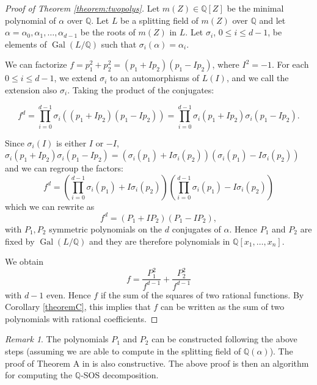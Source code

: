 \documentclass{amsart}
\theoremstyle{definition}
\theoremstyle{remark}
\newtheorem{remark}[theorem]{Remark}
\numberwithin{equation}{section}
\DeclareMathOperator{\Gal}{Gal}
\newcommand{\Q}{{\mathbb Q}}
\begin{document}
\begin{proof}[Proof of Theorem \ref{theorem:twopolys}]
Let $m(Z) \in \Q[Z]$ be the minimal polynomial of $\alpha$ over $\Q$.
Let $L$ be a splitting field of $m(Z)$ over $\Q$ and let $\alpha = \alpha_0, \alpha_1, \dots, \alpha_{d-1}$ be the roots of $m(Z)$ in $L$. Let $\sigma_i$, $0 \le i \le {d-1}$, be elements of $\Gal(L / \Q)$ such that $\sigma_i(\alpha) = \alpha_i$.

We can factorize $f = p_1^2 + p_2^2 = (p_1 + I p_2)(p_1 - I p_2)$, where $I^2 = -1$. For each $0 \le i \le d-1$, we extend $\sigma_i$ to an automorphisms of $L(I)$, and we call the extension also $\sigma_i$. Taking the product of the conjugates:

\[
f^d = \prod_{i=0}^{d-1}  \sigma_i\left((p_1+Ip_2)(p_1-Ip_2)\right) = \prod_{i=0}^{d-1}  \sigma_i(p_1+Ip_2) \sigma_i(p_1-Ip_2).
\]

Since $\sigma_i(I)$ is either $I$ or $-I$,  $\sigma_i(p_1+Ip_2) \sigma_i(p_1-Ip_2) =  (\sigma_i(p_1)+I\sigma_i(p_2)) (\sigma_i(p_1)-I\sigma_i(p_2))$ and we can regroup the factors:
\[
f^d = \left(\prod_{i=0}^{d-1}  \sigma_i(p_1)+I\sigma_i(p_2)\right) \left(\prod_{i=0}^{d-1}  \sigma_i(p_1)-I\sigma_i(p_2)\right)
\]
which we can rewrite as
\[
f^d = \left(  P_1+I P_2\right) \left( P_1-I P_2 \right),
\]
with $P_1, P_2$ symmetric polynomials on the $d$ conjugates of $\alpha$.
Hence $P_1$ and $P_2$ are fixed by $\Gal(L  / \Q)$ and they are therefore polynomials in $\Q[x_1, \dots, x_n]$.

We obtain
\[
f = \frac{P_1^2}{f^{d-1}} + \frac{P_2^2}{f^{d-1}}
\]
with $d-1$ even. Hence $f$ if the sum of the squares of two rational functions.
By Corollary \ref{theoremC}, this implies that $f$ can be written as the sum of two polynomials with rational coefficients.

\end{proof}

\begin{remark} The polynomials $P_1$ and $P_2$ can be constructed following the above steps (assuming we are able to compute in the splitting field of $\Q(\alpha)$). The proof of Theorem A in \cite{choi} is also constructive. The above proof is then an algorithm for computing the $\Q$-SOS decomposition.
\end{remark}
\end{document}
